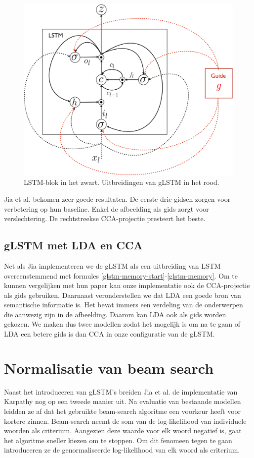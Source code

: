 \begin{figure}[tb][h]
	\centering
	\includegraphics[width=\linewidth]{Images/glstm.pdf}
	\caption{LSTM-blok in het zwart. Uitbreidingen van gLSTM in het rood.}
	\label{fig:glstm}
\end{figure}

Jia et al. bekomen zeer goede resultaten. De eerste drie gidsen zorgen voor verbetering op hun baseline. Enkel de afbeelding als gids zorgt voor verslechtering. De rechtstreekse CCA-projectie presteert het beste.

\subsection{gLSTM met LDA en CCA}
Net als Jia implementeren we de gLSTM als een uitbreiding van LSTM overeenstemmend met formules \ref{glstm-memory-start}-\ref{glstm-memory}.
Om te kunnen vergelijken met hun paper kan onze implementatie ook de CCA-projectie als gids gebruiken.
Daarnaast veronderstellen we dat LDA een goede bron van semantische informatie is. Het bevat immers een verdeling van de onderwerpen die aanwezig zijn in de afbeelding. Daarom kan LDA ook als gids worden gekozen.
We maken dus twee modellen zodat het mogelijk is om na te gaan of LDA een betere gids is dan CCA in onze configuratie van de gLSTM.
 
\section{Normalisatie van beam search}
Naast het introduceren van gLSTM's breiden Jia et al.  de implementatie van Karpathy nog op een tweede manier uit. Na evaluatie van bestaande modellen leidden ze af dat het gebruikte beam-search algoritme een voorkeur heeft voor kortere zinnen. Beam-search neemt de som van de log-likelihood van individuele woorden als criterium. Aangezien deze waarde voor elk woord negatief is, gaat het algoritme sneller kiezen om te stoppen. Om dit fenomeen tegen te gaan introduceren ze de genormaliseerde log-likelihood van elk woord als criterium.

